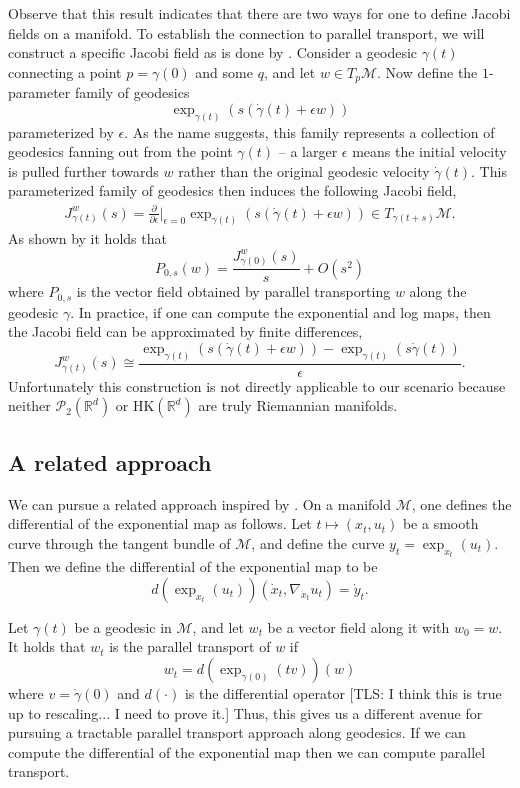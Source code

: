 \documentclass{article}
\newcommand{\man}{\mathcal{M}}
\newcommand{\tls}[1]{{\color{cyan}[TLS: #1]}}
\begin{document}
Observe that this result indicates that there are two ways for one to define Jacobi fields on a manifold. To establish the connection to parallel transport, we will construct a specific Jacobi field as is done by \citet{louis2018fanning}. Consider a geodesic $\gamma(t)$ connecting a point $p = \gamma(0)$ and some $q$, and let $w \in T_p\man$. Now define the $1$-parameter family of geodesics 
\[\exp_{\gamma(t)}(s(\dot{\gamma}(t) + \epsilon w))\]
parameterized by $\epsilon$. As the name  suggests, this family represents a collection of geodesics fanning out from the point $\gamma(t)$ -- a larger $\epsilon$ means the initial velocity is pulled further towards $w$ rather than the original geodesic velocity $\dot{\gamma}(t).$ This parameterized family of geodesics then induces the following Jacobi field,
\begin{align}
    J^{w}_{\gamma(t)}(s) = \frac{\partial}{\partial\epsilon}\bigg|_{\epsilon = 0}\exp_{\gamma(t)}(s(\dot{\gamma}(t) + \epsilon w)) \in T_{\gamma(t+s)}\man.
\end{align}
As shown by \citet{louis2018fanning} it holds that 
\begin{equation}
    P_{0, s}(w) = \frac{J^w_{\gamma(0)}(s)}{s} + O(s^2)
\end{equation}
where $P_{0, s}$ is the vector field obtained by parallel transporting $w$ along the geodesic $\gamma$. In practice, if one can compute the exponential and log maps, then the Jacobi field can be approximated by finite differences,
\[J^w_{\gamma(t)}(s) \cong \frac{\exp_{\gamma(t)}(s(\dot{\gamma}(t) + \epsilon w)) - \exp_{\gamma(t)}(s\dot{\gamma}(t))}{\epsilon}.\]
Unfortunately this construction is not directly applicable to our scenario because neither $\mathcal{P}_2(\mathbb{R}^d)$ or $\text{HK}(\mathbb{R}^d)$ are truly Riemannian manifolds. 

\subsection{A related approach}

We can pursue a related approach inspired by \citet{gigli2012second}. On a manifold $\man$, one defines the differential of the exponential map as follows. Let $t \mapsto (x_t, u_t)$ be a smooth curve through the tangent bundle of $\man$, and define the curve $y_t = \exp_{x_t}(u_t)$. Then we define the differential of the exponential map to be
\[d(\exp_{x_t}(u_t))(\dot x_t, \nabla_{\dot x_t}u_t) = \dot y_t.\]


Let $\gamma(t)$ be a geodesic in $\man$, and let $w_t$ be a vector field along it with $w_0 = w$. It holds that $w_t$ is the parallel transport of $w$ if
\[w_t = d(\exp_{\gamma(0)}(tv))(w)\]
where $v = \dot{\gamma}(0)$ and $d(\cdot)$ is the differential operator \tls{I think this is true up to rescaling... I need to prove it.} Thus, this gives us a different avenue for pursuing a tractable parallel transport approach along geodesics. If we can compute the differential of the exponential map then we can compute parallel transport.
\end{document}

